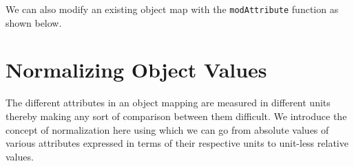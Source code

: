 \documentclass{jfp}
\newcommand{\prog}[1]{\texttt{#1}}
\begin{document}
We can also modify an existing object map with the \prog{modAttribute} function as shown below.

\section{Normalizing Object Values}
The different attributes in an object mapping are measured in different units thereby making any sort of comparison between them difficult. We introduce the concept of normalization here using which we can go from absolute values of various attributes expressed in terms of their respective units to unit-less relative values. 
\end{document}
